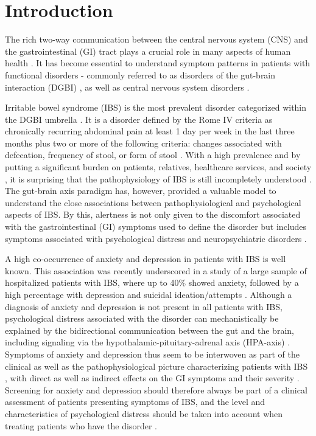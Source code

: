 \documentclass[jcm,article,submit,pdftex,moreauthors]{Definitions/mdpi}
\begin{document}

\section{Introduction}
The rich  two-way communication between the central nervous system (CNS) and the gastrointestinal (GI) tract plays a crucial role in many aspects of human health \cite{Mayer2022}. It has become essential to understand symptom patterns in patients with functional disorders - commonly referred to as disorders of the gut-brain interaction  (DGBI) \cite{sperber2021worldwide}, as well as central nervous system disorders \cite{dinan2017brain}.

Irritable bowel syndrome (IBS) is the most prevalent disorder categorized within the DGBI umbrella \cite{vandvik2006prevalence}. It is a disorder defined by the Rome IV criteria as chronically recurring abdominal pain at least 1 day per week in the last three months plus two or more of the following criteria: changes associated with defecation, frequency of stool, or form of stool \cite{schmulson2017new}. With a high prevalence and by putting a significant burden on patients, relatives, healthcare services, and society \cite{canavan2014economic, corsetti2017global, Fraendemark2018}, it is surprising that the pathophysiology of IBS is still incompletely understood \cite{black2020functional,drossman2002aga, hillestad2022gut}. The gut-brain axis paradigm has, however, provided a valuable model to understand the close associations between pathophysiological and psychological aspects of IBS. By this, alertness is not only given to the discomfort associated with the gastrointestinal (GI) symptoms used to define the disorder but includes symptoms associated with psychological distress and neuropsychiatric disorders \cite{madva2023psychiatric}. 

A high co-occurrence of anxiety and depression in patients with IBS is well known. This association was recently underscored in a study of a large sample of hospitalized patients with IBS, where up to 40\% showed anxiety, followed by a high percentage with depression and suicidal ideation/attempts \cite{tarar2023burden}. Although a diagnosis of anxiety and depression is not present 
in all patients with IBS, psychological distress associated with the disorder can mechanistically be explained by the bidirectional communication between the gut and the brain, including signaling via the hypothalamic-pituitary-adrenal axis (HPA-axis) \cite{tarar2023burden}. Symptoms of anxiety and depression thus seem to be interwoven as  part of the clinical as well as the pathophysiological picture characterizing patients with IBS \cite{midenfjord2019anxiety}, with 
direct as well as indirect effects on the GI symptoms \cite{sibelli2016systematic} and their severity \cite{kutschke2022relationships}. 
Screening for anxiety and depression should therefore always be part of a clinical assessment of patients presenting symptoms of IBS, and the level and characteristics of psychological distress should be taken into account when treating patients who have the disorder \cite{kamp2023symptom}.   
\end{document}
